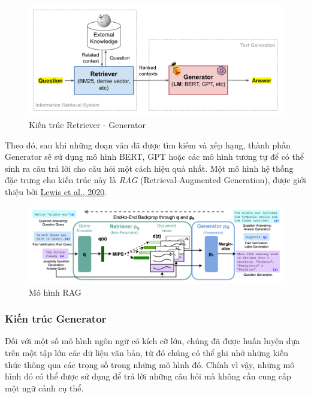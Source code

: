 \begin{figure}[h!]
    \centering
    \includegraphics[width=\linewidth]{img/arch/QA-retiever-generator.png}
    \caption{Kiến trúc Retriever - Generator}
    \label{fig:arch_rg}
\end{figure}

Theo đó, sau khi những đoạn văn đã được tìm kiếm và xếp hạng, thành phần Generator sẽ sử dụng mô hình BERT, GPT hoặc các mô hình tương tự để có thể sinh ra câu trả lời cho câu hỏi một cách hiệu quả nhất. Một mô hình hệ thống đặc trưng cho kiến trúc này là \emph{RAG} (Retrieval-Augmented Generation), được giới thiệu bởi \href{https://arxiv.org/abs/2005.11401}{Lewis et al., 2020}.

\begin{figure}[h!]
    \centering
    \includegraphics[width=\linewidth]{img/arch/RAG.png}
    \caption{Mô hình RAG}
    \label{fig:arch_rg_rag}
\end{figure}

\subsubsection{Kiến trúc Generator}
Đối với một số mô hình ngôn ngữ có kích cỡ lớn, chúng đã được huấn luyện dựa trên một tập lớn các dữ liệu văn bản, từ đó chúng có thể ghi nhớ những kiến thức thông qua các trọng số trong những mô hình đó. Chính vì vậy, những mô hình đó có thể được sử dụng để trả lời những câu hỏi mà không cần cung cấp một ngữ cảnh cụ thể.

